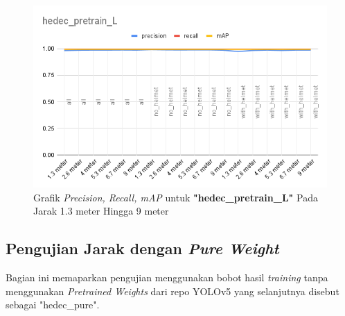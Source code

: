 \begin{enumerate}
  \begin{figure}[ht]
    \centering
    \includegraphics[width=1\textwidth]{gambar/BerdasarkanJarak/hedec_pretrain_L.png}
    \caption{Grafik \emph{Precision, Recall, mAP} untuk \textbf{"hedec\_pretrain\_L"} Pada Jarak 1.3 meter Hingga 9 meter}
    \label{fig:grafvaljarak_hedec_pretrain_L}  
  \end{figure}

\end{enumerate}

\subsection{Pengujian Jarak dengan \emph{Pure Weight}}
\label{subsec:ujijarak_pureweight}

\par Bagian ini memaparkan pengujian menggunakan bobot hasil \emph{training} tanpa menggunakan \emph{Pretrained Weights}
dari repo YOLOv5 yang selanjutnya disebut sebagai "hedec\_pure". 


